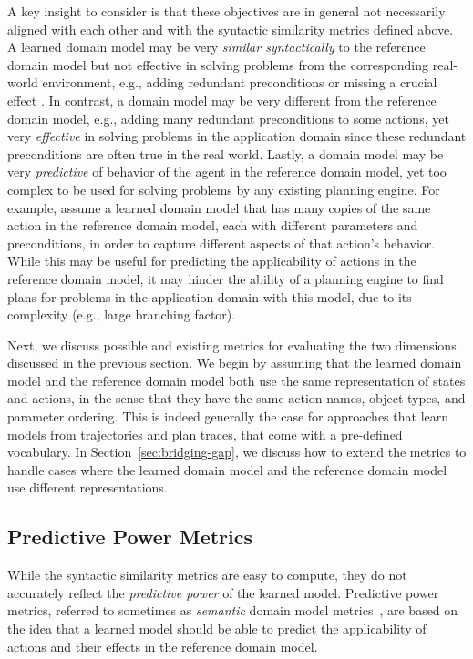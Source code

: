 \documentclass{article}
\theoremstyle{definition}
\theoremstyle{remark}
\newcommand{\mauro}[1]{{\textcolor{green}{[Mauro: #1]}}}
\begin{document}

A key insight to consider 
is that these objectives are in general not necessarily aligned with each other and with the syntactic similarity metrics defined above. 
A learned domain model may be very \emph{similar syntactically} to the reference domain model but not effective in solving problems from the corresponding real-world environment, 
e.g., adding redundant preconditions or missing a crucial effect \cite{DBLP:conf/kcap/VallatiC19}. 
In contrast, a domain model may be very different from the reference domain model, e.g., adding many redundant preconditions to some actions, yet very \emph{effective} in solving problems in the application domain since these redundant preconditions are often true in the real world. 
Lastly, a domain model may be very \emph{predictive} of behavior of the agent in the reference domain model, yet too complex to be used for solving problems by any existing planning engine. 
For example, assume a learned domain model that has many copies of the same action in the reference domain model, each with different parameters and preconditions, in order to capture different aspects of that action's behavior. 
While this may be useful for predicting the applicability of actions in the reference domain model, 
it may hinder the ability of a planning engine to find plans for problems in the application domain with this model, due to its complexity (e.g., large branching factor). 



Next, we discuss possible and existing metrics for evaluating the two dimensions discussed in the previous section. 
We begin by assuming that the learned domain model and the reference domain model both use the same representation of states and actions, %
in the sense that they have the same action names, object types, and parameter ordering. This is indeed generally the case for approaches that learn models from trajectories and plan traces, that come with a pre-defined vocabulary. 
In Section~\ref{sec:bridging-gap}, we discuss how to extend the metrics to handle cases where the learned domain model and the reference domain model use different representations. 



\subsection{Predictive Power Metrics}
\label{sec:predictiveness-metrics}
While the syntactic similarity metrics are easy to compute, they do not accurately reflect the \emph{predictive power} of the learned model. 
Predictive power metrics, referred to sometimes as \emph{semantic} domain model metrics~\citep{aineto2019learning,mordoch2024safe,le2024learning}, are based on the idea that a learned model should be able to predict the applicability of actions and their effects in the reference domain model. 
\end{document}
